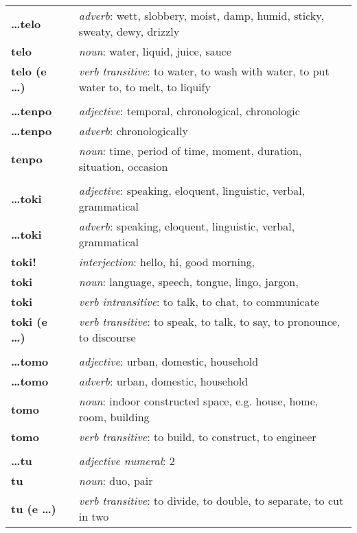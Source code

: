 \begin{supertabular}{p{2,5cm}|ll}
\textbf{\dots telo} && \textit{adverb}: wett, slobbery, moist, damp, humid, sticky, sweaty, dewy, drizzly \\ 
\textbf{telo} && \textit{noun}: water, liquid, juice, sauce \\ 
\textbf{telo (e \dots)} && \textit{verb transitive}: to water, to wash with water, to put water to, to melt, to liquify \\ 
 && \\ %
\textbf{\dots tenpo} && \textit{adjective}: temporal, chronological, chronologic \\ 
\textbf{\dots tenpo} && \textit{adverb}: chronologically \\ 
\textbf{tenpo} && \textit{noun}: time, period of time, moment, duration, situation, occasion \\ 
 && \\ %
\textbf{\dots toki} && \textit{adjective}: speaking, eloquent, linguistic, verbal, grammatical \\ 
\textbf{\dots toki} && \textit{adverb}: speaking, eloquent, linguistic, verbal, grammatical \\ 
\textbf{toki!} && \textit{interjection}: hello, hi, good morning, \\ 
\textbf{toki} && \textit{noun}: language, speech, tongue, lingo, jargon, \\ 
\textbf{toki} && \textit{verb intransitive}: to talk, to chat, to communicate \\ 
\textbf{toki (e \dots)} && \textit{verb transitive}: to speak, to talk, to say, to pronounce, to discourse \\ 
 && \\ %
\textbf{\dots tomo} && \textit{adjective}: urban, domestic, household \\ 
\textbf{\dots tomo} && \textit{adverb}: urban, domestic, household \\ 
\textbf{tomo} && \textit{noun}: indoor constructed space, e.g. house, home, room, building \\ 
\textbf{tomo } && \textit{verb transitive}: to build, to construct, to engineer \\ 
 && \\ %
\textbf{\dots tu} && \textit{adjective numeral}: 2 \\ 
\textbf{tu} && \textit{noun}: duo, pair \\ 
\textbf{tu (e \dots)} && \textit{verb transitive}: to divide, to double, to separate, to cut in two \\ 

\end{supertabular}
